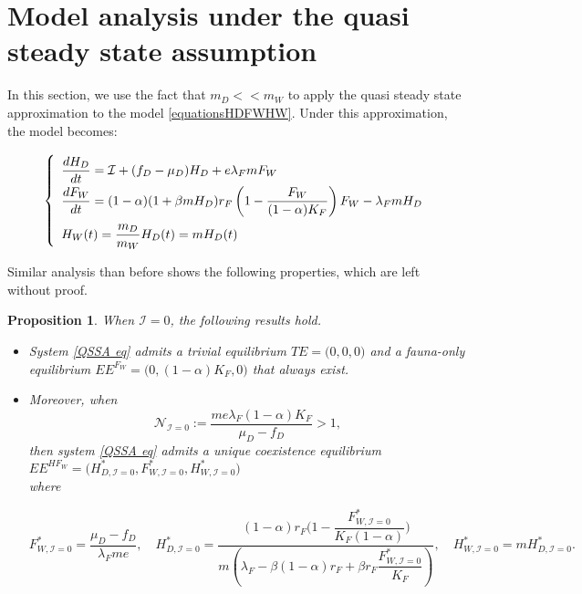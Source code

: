 \documentclass{article}
\newcommand{\lfw}{\lambda_{F}}
\newcommand{\lfw}{\lambda_{F}}
\newcommand{\cI}{\mathcal{I}}
\newtheorem{prop}{Proposition}
\begin{document}
\section{Model analysis under the quasi steady state assumption}
In this section, we use the fact that $m_D <<m_W$ to apply the quasi steady state approximation to the model \eqref{equationsHDFWHW}. Under this approximation, the model becomes:

\begin{equation}
\def\arraystretch{2}
\left\lbrace \begin{array}{l}
\dfrac{dH_D}{dt} = \cI + (f_D - \mu_D) H_D + e \lfw m F_W \\
\dfrac{dF_W}{dt} = (1-\alpha) (1+\beta m H_D) r_F \left(1 - \dfrac{F_W}{(1-\alpha)K_F} \right) F_W - \lfw m H_D \\
H_W(t) = \dfrac{m_D}{m_W} H_D(t) = m H_D(t)
\end{array} \right.
\label{QSSA eq}
\end{equation}

Similar analysis than before shows the following properties, which are left without proof.

\begin{prop}
When $\cI = 0$, the following results hold.
\begin{itemize}
\item System \eqref{QSSA eq} admits a trivial equilibrium $TE = \Big(0,0,0\Big)$ and a fauna-only equilibrium $EE^{F_W} = \Big(0, (1-\alpha)K_F, 0 \Big)$ that always exist.

\item Moreover, when
$$
\mathcal{N}_{\cI = 0} := \dfrac{m e \lfw (1-\alpha)K_F}{\mu_D - f_D} >1,
$$ 
then system \eqref{QSSA eq} admits a unique coexistence equilibrium $EE^{HF_W} = \Big(H^*_{D, \cI = 0}, F^*_{W, \cI = 0}, H^*_{W, \cI = 0} \Big)$ \\ 
where 


$$F^*_{W, \cI = 0} = \dfrac{\mu_D - f_D}{\lfw m e},
\quad 
H^*_{D, \cI = 0} = \dfrac{(1-\alpha)r_F\Big(1 - \dfrac{F^*_{W, \cI = 0}}{K_F(1-\alpha)} \Big)}{m\left(\lfw - \beta (1-\alpha) r_F + \beta r_F  \dfrac{F^*_{W, \cI = 0}}{K_F}\right)} ,
\quad 
H^*_{W, \cI = 0} = m H^*_{D, \cI = 0}.$$
\end{itemize}
\end{prop}
\end{document}
